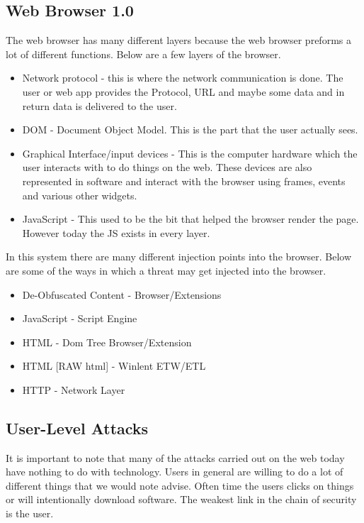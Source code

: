 \documentclass[letterpaper, onecolumn,10pt]{IEEEtran}
\begin{document}
		        \subsection{Web Browser 1.0}
		        The web browser has many different layers because the web browser preforms a lot of different functions. Below are a few layers of the browser.
		        \begin{itemize}
		            \item Network protocol - this is where the network communication is done. The user or web app provides the Protocol, URL and maybe some data and in return data is delivered to the user.\\
		            \item DOM - Document Object Model. This is the part that the user actually sees.
		            \item Graphical Interface/input devices - This is the computer hardware which the user interacts with to do things on the web. These devices are also represented in software and interact with the browser using frames, events and various other widgets.\\
		            \item JavaScript - This used to be the bit that helped the browser render the page. However today the JS exists in every layer.\\
		        \end{itemize}
                In this system there are many different injection points into the browser. Below are some of the ways in which a threat may get injected into the browser.
                \begin{itemize}
                    \item De-Obfuscated Content - Browser/Extensions
                    \item JavaScript - Script Engine
                    \item HTML - Dom Tree Browser/Extension
                    \item HTML [RAW html] - Winlent ETW/ETL
                    \item HTTP - Network Layer
                \end{itemize}
                
                \subsection{User-Level Attacks}
                It is important to note that many of the attacks carried out on the web today have nothing to do with technology. Users in general are willing to do a lot of different things that we would note advise. Often time the users clicks on things or will intentionally download software. The weakest link in the chain of security is the user.\\
                
\end{document}

